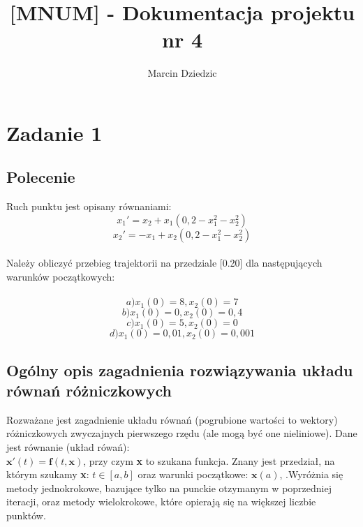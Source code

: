 \documentclass[a4paper, 12pt]{article}
\author{Marcin Dziedzic}
\title{[MNUM] - Dokumentacja projektu  nr 4}
\begin{document}

\maketitle

\section{Zadanie 1}
\subsection{Polecenie}
Ruch punktu jest opisany równaniami:
$$ x_{1}' = x_{2} + x_{1}(0,2 - x_{1}^{2} - x_{2}^{2}) $$
$$ x_{2}' = -x_{1} + x_{2}(0,2 - x_{1}^{2} - x_{2}^{2}) $$\\
Należy obliczyć przebieg trajektorii na przedziale [0.20] dla następujących warunków początkowych: \\
\\
 $$a) x_{1}(0) = 8 ,  x_{2}(0) = 7 $$
 $$b) x_{1}(0) = 0 , x_{2}(0) = 0,4 $$
 $$c) x_{1}(0) = 5 , x_{2}(0) = 0 $$
 $$d) x_{1}(0) = 0,01 , x_{2}(0) = 0,001 $$
 
\subsection{Ogólny opis zagadnienia rozwiązywania układu równań różniczkowych}
Rozważane jest zagadnienie układu równań (pogrubione wartości to wektory) różniczkowych zwyczajnych pierwszego rzędu (ale mogą być one nieliniowe).
Dane jest równanie (układ rówań):\\
$ \mathbf{x'}(t) = \mathbf{f}(t,\mathbf{x}) $, przy czym \textbf{x} to szukana funkcja. Znany jest przedział, na którym szukamy \textbf{x}: $t \in [a,b]$ oraz warunki początkowe: $\mathbf{x}(a)$, .Wyróżnia się metody jednokrokowe, bazujące tylko na punckie otzymanym w poprzedniej iteracji, oraz metody wielokrokowe, które opierają się na większej liczbie punktów.\\
\end{document}
